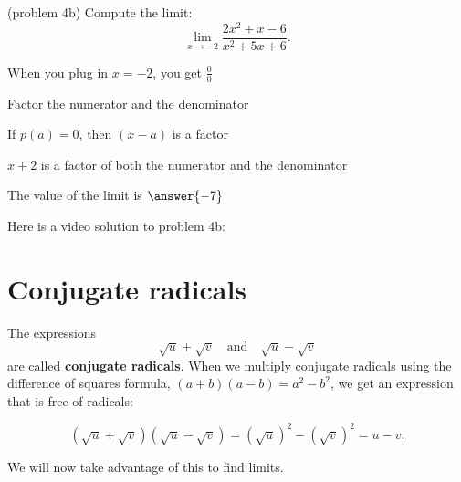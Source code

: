 \documentclass[handout]{ximera}
\begin{document}
\begin{problem}(problem 4b)
  Compute the limit:
  \[
  \lim_{x \to -2} \frac{2x^2 + x - 6}{x^2 + 5x + 6}.
  \]
  
    \begin{hint}
      When you plug in $x = -2$, you get $\frac00$
    \end{hint}
    \begin{hint}
      Factor the numerator and the denominator
    \end{hint}
    \begin{hint}
      If $p(a) = 0$, then $(x-a)$ is a factor
    \end{hint}
    \begin{hint}
      $x+2$ is a factor of both the numerator and the denominator
    \end{hint}
    
		The value of the limit is
		 $\answer{-7}$
		
\end{problem}
Here is a video solution to problem 4b:
\begin{foldable}
\end{foldable}


\section{Conjugate radicals}


The expressions 
\[\sqrt u + \sqrt v \quad \text{and} \quad \sqrt u - \sqrt v\]
 are called
\textbf{conjugate radicals}. When we multiply conjugate radicals
using the difference of squares formula, $(a+b)(a-b) = a^2 - b^2$,
we get an expression that is free of radicals: 

\[(\sqrt u + \sqrt v)(\sqrt u - \sqrt v) = (\sqrt u)^2 - (\sqrt v)^2 = u - v.\]

We will now take advantage of this to find limits.
\end{document}
